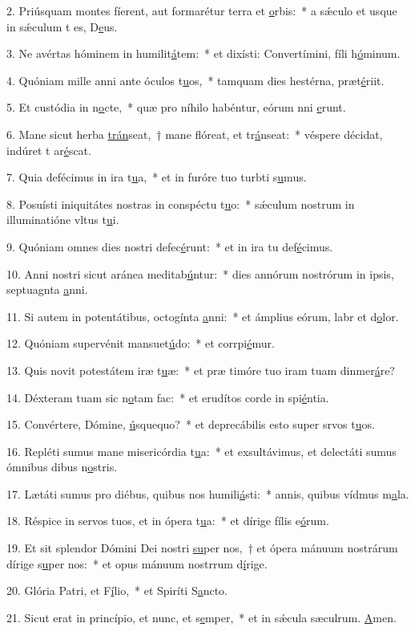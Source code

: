 2. Priúsquam montes fíerent, aut formarétur terra et \uline{o}rbis:~* a sǽculo et usque in sǽculum t es, D\uline{e}us.\par 
3. Ne avértas hóminem in humilit\uline{á}tem:~* et dixísti: Convertímini, fíli h\uline{ó}minum.\par 
4. Quóniam mille anni ante óculos t\uline{u}os,~* tamquam dies hestérna,  præt\uline{é}riit.\par 
5. Et custódia in n\uline{o}cte,~* quæ pro níhilo habéntur, eórum nni \uline{e}runt.\par 
6. Mane sicut herba \uline{trán}seat,~† mane flóreat, et tr\uline{á}nseat:~* véspere décidat, indúret t ar\uline{é}scat.\par 
7. Quia defécimus in ira t\uline{u}a,~* et in furóre tuo turbti s\uline{u}mus.\par 
8. Posuísti iniquitátes nostras in conspéctu t\uline{u}o:~* sǽculum nostrum in illuminatióne vltus t\uline{u}i.\par 
9. Quóniam omnes dies nostri defec\uline{é}runt:~* et in ira tu def\uline{é}cimus.\par 
10. Anni nostri sicut aránea meditab\uline{ú}ntur:~* dies annórum nostrórum in ipsis, septuagnta \uline{a}nni.\par 
11. Si autem in potentátibus, octogínta \uline{a}nni:~* et ámplius eórum, labr et d\uline{o}lor.\par 
12. Quóniam supervénit mansuet\uline{ú}do:~* et corrpi\uline{é}mur.\par 
13. Quis novit potestátem iræ t\uline{u}æ:~* et præ timóre tuo iram tuam dinmer\uline{á}re?\par 
14. Déxteram tuam sic n\uline{o}tam fac:~* et erudítos corde in spi\uline{é}ntia.\par 
15. Convértere, Dómine, \uline{ú}squequo?~* et deprecábilis esto super srvos t\uline{u}os.\par 
16. Repléti sumus mane misericórdia t\uline{u}a:~* et exsultávimus, et delectáti sumus ómnibus dibus n\uline{o}stris.\par 
17. Lætáti sumus pro diébus, quibus nos humili\uline{á}sti:~* annis, quibus vídmus m\uline{a}la.\par 
18. Réspice in servos tuos, et in ópera t\uline{u}a:~* et dírige fílis e\uline{ó}rum.\par 
19. Et sit splendor Dómini Dei nostri \uline{su}per nos,~† et ópera mánuum nostrárum dírige s\uline{u}per nos:~* et opus mánuum nostrrum d\uline{í}rige.\par 
20. Glória Patri, et F\uline{í}lio,~* et Spiríti S\uline{a}ncto.\par 
21. Sicut erat in princípio, et nunc, et s\uline{e}mper,~* et in sǽcula sæculrum. \uline{A}men.\par 
